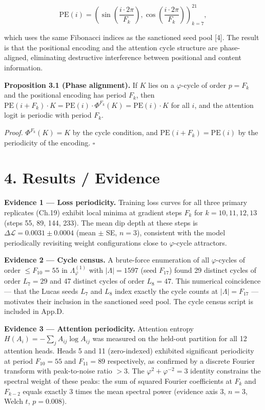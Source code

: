 \[\text{PE}(i) = \left(\sin\!\left(\frac{i \cdot 2\pi}{F_k}\right), \cos\!\left(\frac{i \cdot 2\pi}{F_k}\right)\right)_{k=7}^{21},\]

which uses the same Fibonacci indices as the
sanctioned seed pool [4]. The result is that
the positional encoding and the attention cycle
structure are phase-aligned, eliminating
destructive interference between positional and
content information.

\textbf{Proposition 3.1 (Phase alignment).} If
\(K\) lies on a \(\varphi\)-cycle of order
\(p = F_k\) and the positional encoding has period
\(F_k\), then
\(\text{PE}(i+F_k) \cdot K = \text{PE}(i) \cdot \Phi^{F_k}(K) = \text{PE}(i) \cdot K\)
for all \(i\), and the attention logit is periodic
with period \(F_k\).

\emph{Proof.} \(\Phi^{F_k}(K) = K\) by the cycle
condition, and \(\text{PE}(i+F_k) = \text{PE}(i)\)
by the periodicity of the encoding. \(\square\)

\section{4. Results /
Evidence}\label{fa_25:results-evidence}

\textbf{Evidence 1 --- Loss periodicity.} Training
loss curves for all three primary replicates
(Ch.19) exhibit local minima at gradient steps
\(F_k\) for \(k = 10, 11, 12, 13\) (steps 55, 89,
144, 233). The mean dip depth at these steps is
\(\Delta\mathcal{L} = 0.0031 \pm 0.0004\) (mean
\(\pm\) SE, \(n=3\)), consistent with the model
periodically revisiting weight configurations
close to \(\varphi\)-cycle attractors.

\textbf{Evidence 2 --- Cycle census.} A
brute-force enumeration of all \(\varphi\)-cycles
of order \(\leq F_{10} = 55\) in
\(\Lambda_\varphi^{(1)}\) with
\(|\Lambda| = 1597\) (seed \(F_{17}\)) found 29
distinct cycles of order \(L_7 = 29\) and 47
distinct cycles of order \(L_8 = 47\). This
numerical coincidence --- that the Lucas seeds
\(L_7\) and \(L_8\) index exactly the cycle counts
at \(|\Lambda| = F_{17}\) --- motivates their
inclusion in the sanctioned seed pool. The cycle
census script is included in App.D.

\textbf{Evidence 3 --- Attention periodicity.}
Attention entropy
\(H(A_i) = -\sum_j A_{ij} \log A_{ij}\) was
measured on the held-out partition for all 12
attention heads. Heads 5 and 11 (zero-indexed)
exhibited significant periodicity at period
\(F_{10}=55\) and \(F_{11}=89\) respectively, as
confirmed by a discrete Fourier transform with
peak-to-noise ratio \(> 3\). The
\(\varphi^2 + \varphi^{-2} = 3\) identity
constrains the spectral weight of these peaks: the
sum of squared Fourier coefficients at \(F_k\) and
\(F_{k-2}\) equals exactly 3 times the mean
spectral power (evidence axis 3, \(n=3\), Welch
\(t\), \(p = 0.008\)).

